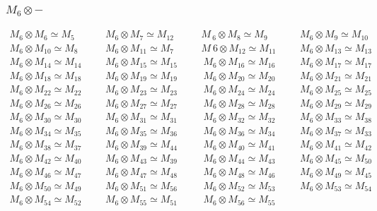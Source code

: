 \subsubsection{$M_6\otimes -$}
\begin{align*}
M_{6} \otimes M_{6} \simeq M_{5} &&& M_{6} \otimes M_{7} \simeq M_{12} &&& M_{\
6} \otimes M_{8} \simeq M_{9} &&& M_{6} \otimes M_{9} \simeq M_{10}\\
M_{6} \otimes M_{10} \simeq M_{8} &&& M_{6} \otimes M_{11} \simeq M_{7} &&& M_\
{6} \otimes M_{12} \simeq M_{11} &&& M_{6} \otimes M_{13} \simeq M_{13}\\
M_{6} \otimes M_{14} \simeq M_{14} &&& M_{6} \otimes M_{15} \simeq M_{15} &&& \
M_{6} \otimes M_{16} \simeq M_{16} &&& M_{6} \otimes M_{17} \simeq M_{17}\\
M_{6} \otimes M_{18} \simeq M_{18} &&& M_{6} \otimes M_{19} \simeq M_{19} &&& \
M_{6} \otimes M_{20} \simeq M_{20} &&& M_{6} \otimes M_{21} \simeq M_{21}\\
M_{6} \otimes M_{22} \simeq M_{22} &&& M_{6} \otimes M_{23} \simeq M_{23} &&& \
M_{6} \otimes M_{24} \simeq M_{24} &&& M_{6} \otimes M_{25} \simeq M_{25}\\
M_{6} \otimes M_{26} \simeq M_{26} &&& M_{6} \otimes M_{27} \simeq M_{27} &&& \
M_{6} \otimes M_{28} \simeq M_{28} &&& M_{6} \otimes M_{29} \simeq M_{29}\\
M_{6} \otimes M_{30} \simeq M_{30} &&& M_{6} \otimes M_{31} \simeq M_{31} &&& \
M_{6} \otimes M_{32} \simeq M_{32} &&& M_{6} \otimes M_{33} \simeq M_{38}\\
M_{6} \otimes M_{34} \simeq M_{35} &&& M_{6} \otimes M_{35} \simeq M_{36} &&& \
M_{6} \otimes M_{36} \simeq M_{34} &&& M_{6} \otimes M_{37} \simeq M_{33}\\
M_{6} \otimes M_{38} \simeq M_{37} &&& M_{6} \otimes M_{39} \simeq M_{44} &&& \
M_{6} \otimes M_{40} \simeq M_{41} &&& M_{6} \otimes M_{41} \simeq M_{42}\\
M_{6} \otimes M_{42} \simeq M_{40} &&& M_{6} \otimes M_{43} \simeq M_{39} &&& \
M_{6} \otimes M_{44} \simeq M_{43} &&& M_{6} \otimes M_{45} \simeq M_{50}\\
M_{6} \otimes M_{46} \simeq M_{47} &&& M_{6} \otimes M_{47} \simeq M_{48} &&& \
M_{6} \otimes M_{48} \simeq M_{46} &&& M_{6} \otimes M_{49} \simeq M_{45}\\
M_{6} \otimes M_{50} \simeq M_{49} &&& M_{6} \otimes M_{51} \simeq M_{56} &&& \
M_{6} \otimes M_{52} \simeq M_{53} &&& M_{6} \otimes M_{53} \simeq M_{54}\\
M_{6} \otimes M_{54} \simeq M_{52} &&& M_{6} \otimes M_{55} \simeq M_{51} &&& \
M_{6} \otimes M_{56} \simeq M_{55}\\
\end{align*}

